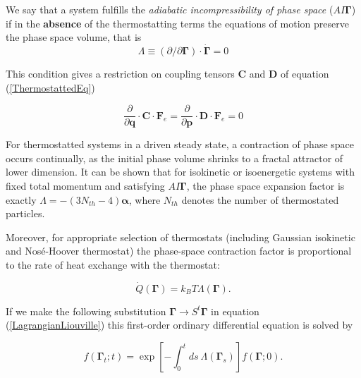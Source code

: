 \documentclass[a4paper,12pt]{article}
\begin{document}

We say that a system fulfills the \textit{adiabatic incompressibility of phase space} ($AI\bm{\Gamma}$) if in the \textbf{absence} of the thermostatting terms the equations of motion preserve the phase space volume, that is
\begin{equation}
  \Lambda \equiv (\partial / \partial\bm{\Gamma}) \cdot \dot{\bm{\Gamma}}=0
\end{equation}

This condition gives a restriction on coupling tensors $\textbf{C}$ and $\textbf{D}$ of equation (\ref{ThermostattedEq})

\begin{equation}
  \frac{\partial}{\partial{\bm{q}}}\cdot\bm{C}\cdot\bm{F}_e=  \frac{\partial}{\partial{\bm{p}}}\cdot\bm{D}\cdot\bm{F}_e =0
\end{equation}

For thermostatted systems in a driven steady state, a contraction of phase space occurs continually, as the initial phase volume shrinks to a fractal attractor of lower dimension.
It can be shown\cite{Evans:2241458} that for isokinetic or isoenergetic systems with fixed total momentum and satisfying $AI\bm{\Gamma}$, the phase space expansion factor is exactly $\Lambda = - (3N_{th} -4) \bm{\alpha} $, where $N_{th}$ denotes the number of thermostated particles.

Moreover, for appropriate selection of thermostats (including Gaussian isokinetic and Nosé-Hoover thermostat) the phase-space contraction factor is proportional to the rate of heat exchange with the thermostat:

\begin{equation}
  \dot{Q}(\bm{\Gamma})=k_B T \Lambda(\bm{\Gamma}).
\end{equation}


If we make the following substitution $\bm{\Gamma} \to S^t\bm{\Gamma}$ in equation (\ref{LagrangianLiouville}) this first-order ordinary differential equation is solved by

\begin{equation}
\label{distributionStreaming}
  f(\bm{\Gamma}_t;t)=\exp[-\int_0^t ds\ \Lambda(\bm{\Gamma}_s)]f(\bm{\Gamma};0).
\end{equation}
\end{document}
